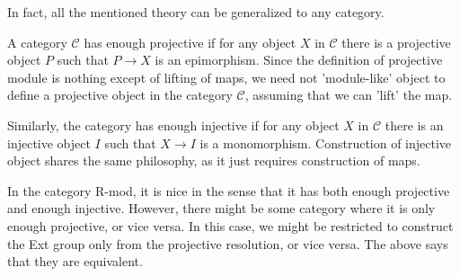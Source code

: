\begin{re} 
    In fact, all the mentioned theory can be generalized to any category.
    
    A category $\mathcal C$ has enough projective if for any object $X$ in $\mathcal C$ there is a projective object $P$ such that $P\to X$ is an epimorphism. Since the definition of projective module is nothing except of lifting of maps, we need not 'module-like' object to define a projective object in the category $\mathcal C$, assuming that we can 'lift' the map.

    Similarly, the category has enough injective if for any object $X$ in $\mathcal C$ there is an injective object $I$ such that $X\to I$ is a monomorphism. Construction of injective object shares the same philosophy, as it just requires construction of maps.

    In the category R-mod, it is nice in the sense that it has both enough projective and enough injective. However, there might be some category where it is only enough projective, or vice versa. In this case, we might be restricted to construct the Ext group only from the projective resolution, or vice versa. The above says that they are equivalent.
\end{re}

\medskip

